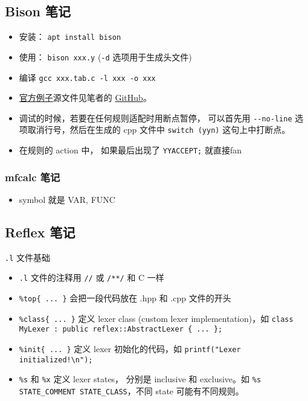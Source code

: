 \subsection{Bison 笔记}
\begin{itemize}
\item 安装： \verb`apt install bison`
\item 使用： \verb`bison xxx.y` (\verb`-d` 选项用于生成头文件)
\item 编译 \verb`gcc xxx.tab.c -l xxx -o xxx`
\item \href{http://web.mit.edu/gnu/doc/html/bison_5.html}{官方例子}源文件见笔者的 \href{https://github.com/MacroUniverse/bison_test}{GitHub}。
\item 调试的时候，若要在任何规则适配时用断点暂停， 可以首先用 \verb`--no-line` 选项取消行号，然后在生成的 cpp 文件中 \verb`switch (yyn)` 这句上中打断点。
\item 在规则的 action 中， 如果最后出现了 \verb`YYACCEPT;` 就直接fan
\end{itemize}

\subsubsection{mfcalc 笔记}
\begin{itemize}
\item symbol 就是 VAR, FUNC
\end{itemize}

\subsection{Reflex 笔记}
\verb`.l` 文件基础
\begin{itemize}
\item \verb`.l` 文件的注释用 \verb`//` 或 \verb`/**/` 和 C 一样
\item \verb`%top{ ... }` 会把一段代码放在 .hpp 和 .cpp 文件的开头
\item \verb`%class{ ... }` 定义 lexer class (custom lexer implementation)，如 \verb`class MyLexer : public reflex::AbstractLexer { ... };`
\item \verb`%init{ ... }` 定义 lexer 初始化的代码，如 \verb`printf("Lexer initialized!\n");`
\item \verb`%s` 和 \verb`%x` 定义 lexer states， 分别是 inclusive 和 exclusive。如 \verb`%s STATE_COMMENT STATE_CLASS`，不同 state 可能有不同规则。
\end{itemize}
